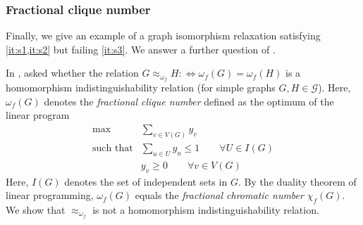 \documentclass[11pt]{scrartcl}
\theoremstyle{definition}
\theoremstyle{plain}
\theoremstyle{remark}
\newcommand{\G}{\mathcal{G}}
\newcommand{\defiff}{:\!\!\iff}
\begin{document}
	\subsubsection{Fractional clique number}

    Finally, we give an example of a graph isomorphism relaxation satisfying \cref{it:s1,it:s2} but failing \cref{it:s3}. We answer a further question of \textcite{atserias_expressive_2021}.

    In \cite[Section~VII]{atserias_expressive_2021}, \citeauthor{atserias_expressive_2021}
    asked whether the relation $G \approx_{\omega_f} H \defiff \omega_f(G) = \omega_f(H)$ is a homomorphism indistinguishability relation (for simple graphs $G, H \in \G$).
    Here, $\omega_f(G)$ denotes the \emph{fractional clique number} defined as the optimum of the linear program
    \begin{align*}
        \max &\sum_{v\in V(G)} y_v \\
        \text{such that}& \sum_{u \in U} y_u \leq 1 \qquad \forall U \in I(G) \\
        & y_v \geq 0 \qquad \forall v \in V(G)
    \end{align*}
    Here, $I(G)$ denotes the set of independent sets in $G$. By the duality theorem of linear programming, $\omega_f(G)$ equals the \emph{fractional chromatic number} $\chi_f(G)$.
    We show that $\approx_{\omega_f}$ is not a homomorphism indistinguishability relation.
\end{document}
